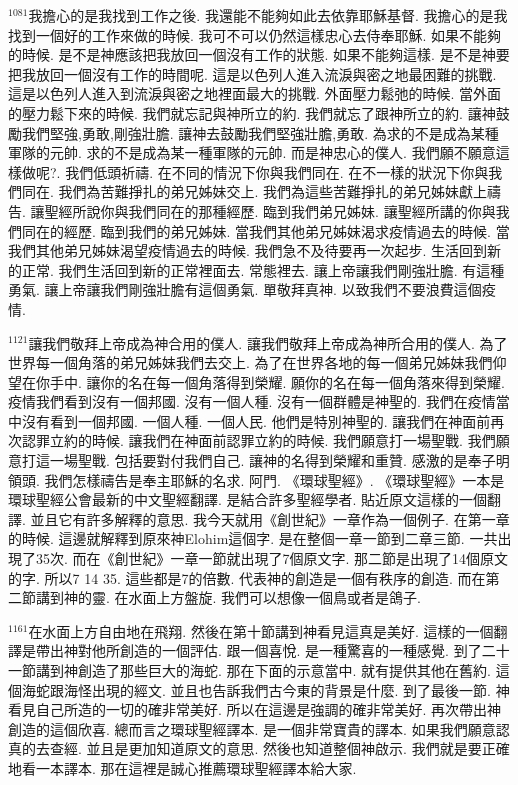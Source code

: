 \documentclass{book}
\begin{document}
$^{1081}$我擔心的是我找到工作之後.
我還能不能夠如此去依靠耶穌基督.
我擔心的是我找到一個好的工作來做的時候.
我可不可以仍然這樣忠心去侍奉耶穌.
如果不能夠的時候.
是不是神應該把我放回一個沒有工作的狀態.
如果不能夠這樣.
是不是神要把我放回一個沒有工作的時間呢.
這是以色列人進入流淚與密之地最困難的挑戰.
這是以色列人進入到流淚與密之地裡面最大的挑戰.
外面壓力鬆弛的時候.
當外面的壓力鬆下來的時候.
我們就忘記與神所立的約.
我們就忘了跟神所立的約.
讓神鼓勵我們堅強,勇敢,剛強壯膽.
讓神去鼓勵我們堅強壯膽,勇敢.
為求的不是成為某種軍隊的元帥.
求的不是成為某一種軍隊的元帥.
而是神忠心的僕人.
我們願不願意這樣做呢?.
我們低頭祈禱.
在不同的情況下你與我們同在.
在不一樣的狀況下你與我們同在.
我們為苦難掙扎的弟兄姊妹交上.
我們為這些苦難掙扎的弟兄姊妹獻上禱告.
讓聖經所說你與我們同在的那種經歷.
臨到我們弟兄姊妹.
讓聖經所講的你與我們同在的經歷.
臨到我們的弟兄姊妹.
當我們其他弟兄姊妹渴求疫情過去的時候.
當我們其他弟兄姊妹渴望疫情過去的時候.
我們急不及待要再一次起步.
生活回到新的正常.
我們生活回到新的正常裡面去.
常態裡去.
讓上帝讓我們剛強壯膽.
有這種勇氣.
讓上帝讓我們剛強壯膽有這個勇氣.
單敬拜真神.
以致我們不要浪費這個疫情.

$^{1121}$讓我們敬拜上帝成為神合用的僕人.
讓我們敬拜上帝成為神所合用的僕人.
為了世界每一個角落的弟兄姊妹我們去交上.
為了在世界各地的每一個弟兄姊妹我們仰望在你手中.
讓你的名在每一個角落得到榮耀.
願你的名在每一個角落來得到榮耀.
疫情我們看到沒有一個邦國.
沒有一個人種.
沒有一個群體是神聖的.
我們在疫情當中沒有看到一個邦國.
一個人種.
一個人民.
他們是特別神聖的.
讓我們在神面前再次認罪立約的時候.
讓我們在神面前認罪立約的時候.
我們願意打一場聖戰.
我們願意打這一場聖戰.
包括要對付我們自己.
讓神的名得到榮耀和重贊.
感激的是奉子明領頭.
我們怎樣禱告是奉主耶穌的名求.
阿門.
《環球聖經》.
《環球聖經》一本是環球聖經公會最新的中文聖經翻譯.
是結合許多聖經學者.
貼近原文這樣的一個翻譯.
並且它有許多解釋的意思.
我今天就用《創世紀》一章作為一個例子.
在第一章的時候.
這邊就解釋到原來神Elohim這個字.
是在整個一章一節到二章三節.
一共出現了35次.
而在《創世紀》一章一節就出現了7個原文字.
那二節是出現了14個原文的字.
所以7 14 35.
這些都是7的倍數.
代表神的創造是一個有秩序的創造.
而在第二節講到神的靈.
在水面上方盤旋.
我們可以想像一個鳥或者是鴿子.

$^{1161}$在水面上方自由地在飛翔.
然後在第十節講到神看見這真是美好.
這樣的一個翻譯是帶出神對他所創造的一個評估.
跟一個喜悅.
是一種驚喜的一種感覺.
到了二十一節講到神創造了那些巨大的海蛇.
那在下面的示意當中.
就有提供其他在舊約.
這個海蛇跟海怪出現的經文.
並且也告訴我們古今東的背景是什麼.
到了最後一節.
神看見自己所造的一切的確非常美好.
所以在這邊是強調的確非常美好.
再次帶出神創造的這個欣喜.
總而言之環球聖經譯本.
是一個非常寶貴的譯本.
如果我們願意認真的去查經.
並且是更加知道原文的意思.
然後也知道整個神啟示.
我們就是要正確地看一本譯本.
那在這裡是誠心推薦環球聖經譯本給大家.
\newpage
\end{document}

